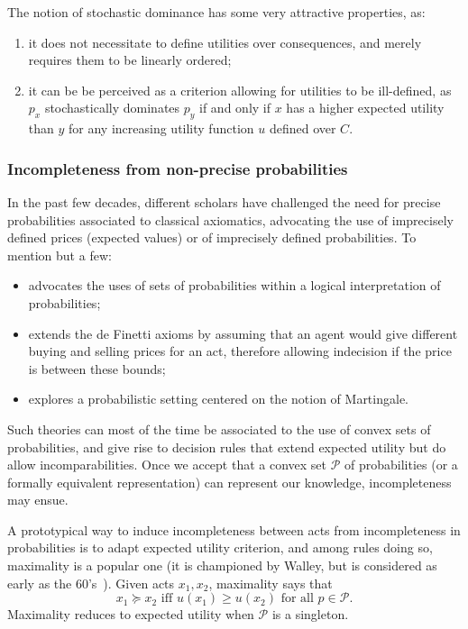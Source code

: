 \documentclass[french, english]{llncs}
\begin{document}
The notion of stochastic dominance has some very attractive properties, as:
\begin{enumerate}
	\item it does not necessitate to define utilities over consequences, and merely requires them to be linearly ordered;
	\item it can be be perceived as a criterion allowing for utilities to be ill-defined, as $p_x$ stochastically dominates $p_y$ if and only if $x$ has a higher expected utility than $y$ for any increasing utility function $u$ defined over $C$. 
\end{enumerate}

\subsubsection{Incompleteness from non-precise probabilities}

In the past few decades, different scholars have challenged the need for precise probabilities associated to classical axiomatics, advocating the use of imprecisely defined prices (expected values) or of imprecisely defined probabilities. To mention but a few:
\begin{itemize} 
	\item \citet{levi_enterprise_1983} advocates the uses of sets of probabilities within a logical interpretation of probabilities;
	\item \citet{walley_statistical_1991} extends the de Finetti axioms by assuming that an agent would give different buying and selling prices for an act, therefore allowing indecision if the price is between these bounds;
	\item \citet{shafer_probability_2005} explores a probabilistic setting centered on the notion of Martingale.
\end{itemize}
Such theories can most of the time be associated to the use of convex sets of probabilities, and give rise to decision rules that extend expected utility but do allow incomparabilities. Once we accept that a convex set $\mathcal{P}$ of probabilities (or a formally equivalent representation) can represent our knowledge, incompleteness may ensue. 

A prototypical way to induce incompleteness between acts from incompleteness in probabilities is to adapt expected utility criterion, and among rules doing so, maximality is a popular one (it is championed by Walley, but is considered as early as the 60's~\citep{aumann_utility_1962}). Given acts $x_1, x_2$, maximality says that 
$$x_1 \succeq x_2 \text{ iff }  u(x_1) ≥ u(x_2) \text{ for all } p \in \mathcal{P}.$$
Maximality reduces to expected utility when $\mathcal{P}$ is a singleton. 
\end{document}
